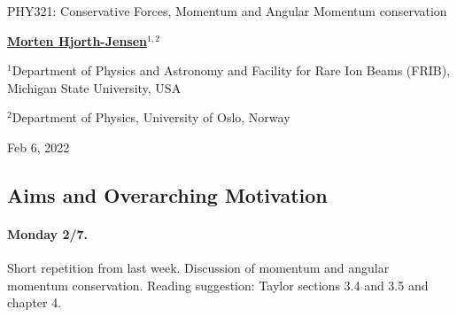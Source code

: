 \documentclass[%
oneside,                 %
final,                   %
10pt]{article}
\begin{document}

\newcommand{\exercisesection}[1]{\subsection*{#1}}






\thispagestyle{empty}

\begin{center}
{\LARGE\bf
\begin{spacing}{1.25}
PHY321: Conservative Forces, Momentum and Angular Momentum conservation
\end{spacing}
}
\end{center}


\begin{center}
{\bf \href{{http://mhjgit.github.io/info/doc/web/}}{Morten Hjorth-Jensen}${}^{1, 2}$} \\ [0mm]
\end{center}

\begin{center}
\centerline{{\small ${}^1$Department of Physics and Astronomy and Facility for Rare Ion Beams (FRIB), Michigan State University, USA}}
\centerline{{\small ${}^2$Department of Physics, University of Oslo, Norway}}
\end{center}
    

\begin{center}
Feb 6, 2022
\end{center}

\vspace{1cm}


\subsection*{Aims and Overarching Motivation}

\paragraph{Monday 2/7.}
Short repetition from last week. Discussion of momentum and angular momentum conservation.
Reading suggestion: Taylor sections 3.4 and 3.5 and chapter 4.
\end{document}
